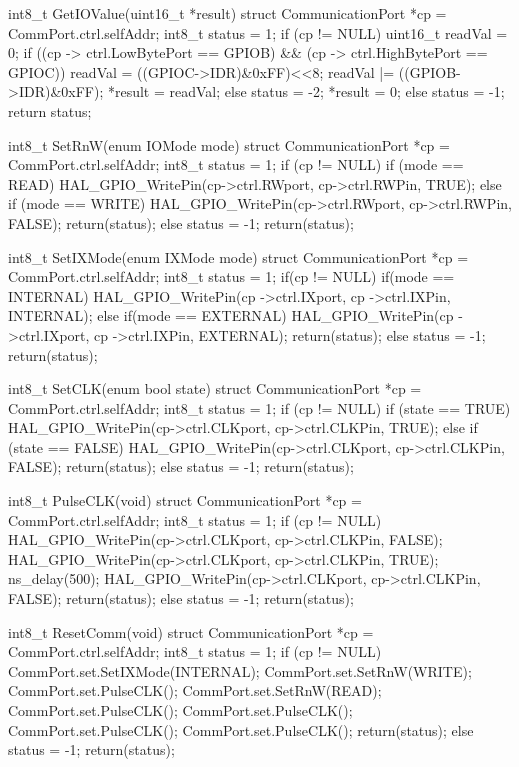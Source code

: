 int8_t GetIOValue(uint16_t *result) {
	struct CommunicationPort *cp = CommPort.ctrl.selfAddr;
	int8_t status = 1;
	if (cp != NULL) {
		uint16_t readVal = 0;
		if ((cp -> ctrl.LowBytePort == GPIOB) && (cp -> ctrl.HighBytePort == GPIOC)) {
			readVal = ((GPIOC->IDR)&0xFF)<<8;
			readVal |= ((GPIOB->IDR)&0xFF);
			*result = readVal;
		} else {
			status = -2;
			*result = 0;
		}
	} else {
		status = -1;
	}
	return status;
}

int8_t SetRnW(enum IOMode mode) {
	struct CommunicationPort *cp = CommPort.ctrl.selfAddr;
	int8_t status = 1;
	if (cp != NULL) {
		if (mode == READ) {
			HAL_GPIO_WritePin(cp->ctrl.RWport, cp->ctrl.RWPin, TRUE);
		}
		else if (mode == WRITE) {
			HAL_GPIO_WritePin(cp->ctrl.RWport, cp->ctrl.RWPin, FALSE);
		}
		return(status);
	}
	else {
		status = -1;
		return(status);
	}
}

int8_t SetIXMode(enum IXMode mode) {
	struct CommunicationPort *cp = CommPort.ctrl.selfAddr;
	int8_t status = 1;
	if(cp != NULL) {
		if(mode == INTERNAL) {
			HAL_GPIO_WritePin(cp ->ctrl.IXport, cp ->ctrl.IXPin, INTERNAL);
		}
		else if(mode == EXTERNAL) {
			HAL_GPIO_WritePin(cp ->ctrl.IXport, cp ->ctrl.IXPin, EXTERNAL);
		}
		return(status);
	}
	else {
		status = -1;
		return(status);
	}
}

int8_t SetCLK(enum bool state) {
	struct CommunicationPort *cp = CommPort.ctrl.selfAddr;
	int8_t status = 1;
	if (cp != NULL) {
		if (state == TRUE) {
			HAL_GPIO_WritePin(cp->ctrl.CLKport, cp->ctrl.CLKPin, TRUE);
		}
		else if (state == FALSE) {
			HAL_GPIO_WritePin(cp->ctrl.CLKport, cp->ctrl.CLKPin, FALSE);
		}
		return(status);
	}
	else {
		status = -1;
		return(status);
	}
}

int8_t PulseCLK(void) {
	struct CommunicationPort *cp = CommPort.ctrl.selfAddr;
	int8_t status = 1;
	if (cp != NULL) {
		HAL_GPIO_WritePin(cp->ctrl.CLKport, cp->ctrl.CLKPin, FALSE);
		HAL_GPIO_WritePin(cp->ctrl.CLKport, cp->ctrl.CLKPin, TRUE);
		ns_delay(500);
		HAL_GPIO_WritePin(cp->ctrl.CLKport, cp->ctrl.CLKPin, FALSE);
		return(status);
	}
	else {
		status = -1;
		return(status);
	}
}

int8_t ResetComm(void) {
	struct CommunicationPort *cp = CommPort.ctrl.selfAddr;
	int8_t status = 1;
	if (cp != NULL) {
		CommPort.set.SetIXMode(INTERNAL);
		CommPort.set.SetRnW(WRITE);
		CommPort.set.PulseCLK();
		CommPort.set.SetRnW(READ);
		CommPort.set.PulseCLK();
		CommPort.set.PulseCLK();
		CommPort.set.PulseCLK();
		CommPort.set.PulseCLK();
		return(status);
	}
	else {
		status = -1;
		return(status);
	}
}

